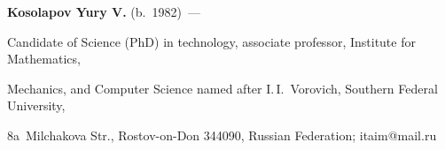 




\Contrl



\noindent

\textbf{Kosolapov Yury V.} (b.\ 1982)~---  

Candidate of Science (PhD) in technology, associate professor, Institute for Mathematics, 

Mechanics, and Computer Science named after I.\,I.~Vorovich, Southern Federal University, 

8a~Milchakova Str., Rostov-on-Don 344090, Russian Federation; \mbox{itaim@mail.ru}





 

\label{end\stat}



\renewcommand{\bibname}{\protect\rm Литература} 

